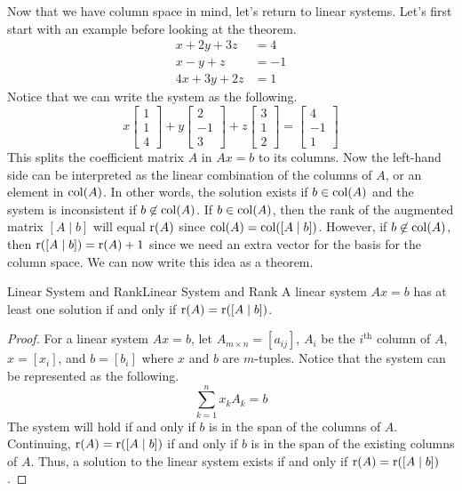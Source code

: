 \documentclass[../main.tex]{subfiles}
\begin{document}
Now that we have column space in mind, let's return to linear systems.
Let's first start with an example before looking at the theorem.
\begin{align*}
    x + 2y + 3z &= 4 \\
    x - y + z &= -1 \\
    4x + 3y + 2z &= 1
\end{align*}
Notice that we can write the system as the following.
\[
x
\begin{bmatrix}
    1 \\
    1 \\
    4
\end{bmatrix}
+
y \begin{bmatrix}
    2 \\
    -1 \\
    3
\end{bmatrix}
+ z
\begin{bmatrix}
    3 \\
    1 \\
    2
\end{bmatrix}
=
\begin{bmatrix}
    4 \\
    -1 \\
    1
\end{bmatrix}
\]
This splits the coefficient matrix $A$ in $Ax = b$ to its columns.
Now the left-hand side can be interpreted as the linear combination
of the columns of $A$, or an element in $\operatorname{col}(A)$. In other words,
the solution exists if $b \in \operatorname{col}(A)$ and the system is inconsistent
if $b \not\in \operatorname{col}(A)$. If $b \in \operatorname{col}(A)$, then the rank of the
augmented matrix $[A \mid b]$ will equal $\operatorname{r}(A)$ since $\operatorname{col}(A) =
\operatorname{col}([A \mid b])$. However, if $b \not\in \operatorname{col}(A)$, then
$\operatorname{r}([A \mid b]) = \operatorname{r}(A) + 1$ since we need an extra vector for
the basis for the column space. We can now write this idea as a
theorem.

\begin{theorem}{Linear System and Rank}{Linear System and Rank}
A linear system $Ax = b$ has at least one solution if and only if
$\operatorname{r}(A) = \operatorname{r}([A \mid b])$.
\end{theorem}
\begin{proof}
For a linear system $Ax = b$, let $A_{m \times n} = [a_{ij}]$,
$A_i$ be the $i^\text{th}$ column of $A$, $x = [x_i]$, and $b = [b_i]$
where $x$ and $b$ are $m$-tuples. Notice that the system can be
represented as the following.
\[
\sum_{k=1}^n x_k A_k = b
\]
The system will hold if and only if $b$ is in the span of the columns
of $A$. Continuing, $\operatorname{r}(A) = \operatorname{r}([A \mid b])$ if and only if $b$
is in the span of the existing columns of $A$. Thus, a solution to the
linear system exists if and only if $\operatorname{r}(A) = \operatorname{r}([A \mid b])$.
\end{proof}
\end{document}
